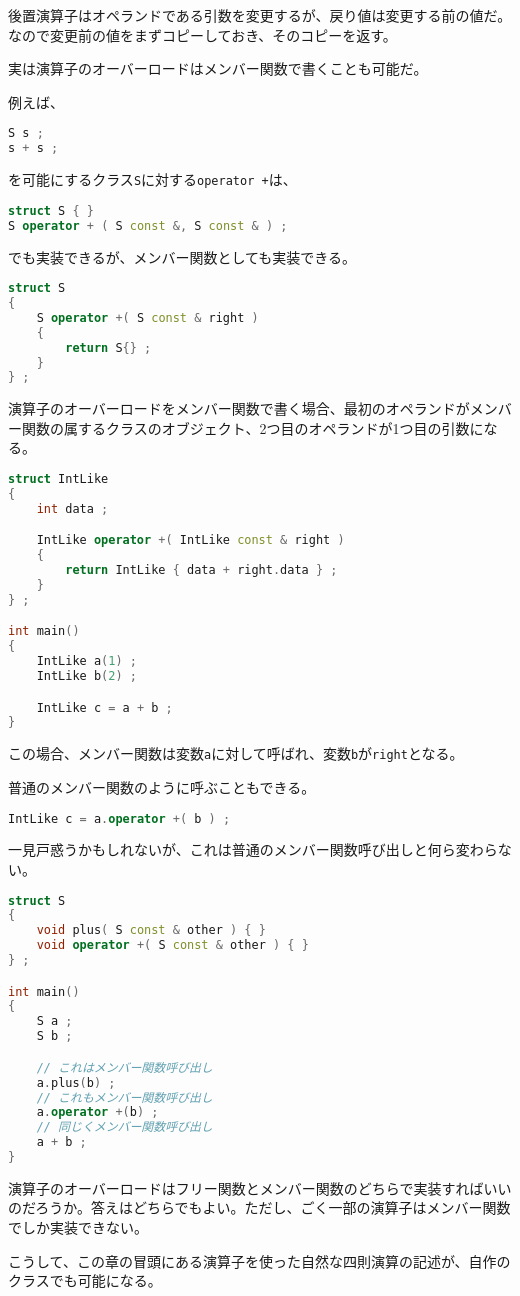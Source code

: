 後置演算子はオペランドである引数を変更するが、戻り値は変更する前の値だ。なので変更前の値をまずコピーしておき、そのコピーを返す。


実は演算子のオーバーロードはメンバー関数で書くことも可能だ。

例えば、
\begin{lstlisting}[language={C++}]
S s ;
s + s ;
\end{lstlisting}
を可能にするクラス\texttt{S}に対する\texttt{operator +}は、
\begin{lstlisting}[language={C++}]
struct S { }
S operator + ( S const &, S const & ) ;
\end{lstlisting}
でも実装できるが、メンバー関数としても実装できる。

\begin{lstlisting}[language={C++}]
struct S
{
    S operator +( S const & right )
    {
        return S{} ;
    }
} ;
\end{lstlisting}

演算子のオーバーロードをメンバー関数で書く場合、最初のオペランドがメンバー関数の属するクラスのオブジェクト、2つ目のオペランドが1つ目の引数になる。

\begin{lstlisting}[language={C++}]
struct IntLike
{
    int data ;

    IntLike operator +( IntLike const & right )
    {
        return IntLike { data + right.data } ;
    }
} ;

int main()
{
    IntLike a(1) ;
    IntLike b(2) ;

    IntLike c = a + b ;
}
\end{lstlisting}

この場合、メンバー関数は変数\texttt{a}に対して呼ばれ、変数\texttt{b}が\texttt{right}となる。

普通のメンバー関数のように呼ぶこともできる。

\begin{lstlisting}[language={C++}]
IntLike c = a.operator +( b ) ;
\end{lstlisting}

一見戸惑うかもしれないが、これは普通のメンバー関数呼び出しと何ら変わらない。

\begin{lstlisting}[language={C++}]
struct S
{
    void plus( S const & other ) { }
    void operator +( S const & other ) { }
} ;

int main()
{
    S a ;
    S b ;

    // これはメンバー関数呼び出し
    a.plus(b) ;
    // これもメンバー関数呼び出し
    a.operator +(b) ;
    // 同じくメンバー関数呼び出し
    a + b ;
}
\end{lstlisting}

演算子のオーバーロードはフリー関数とメンバー関数のどちらで実装すればいいのだろうか。答えはどちらでもよい。ただし、ごく一部の演算子はメンバー関数でしか実装できない。

こうして、この章の冒頭にある演算子を使った自然な四則演算の記述が、自作のクラスでも可能になる。
